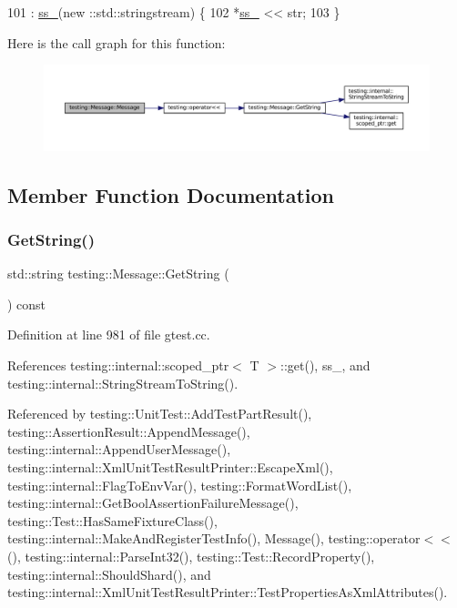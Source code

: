 \begin{DoxyCode}
101                                     : \hyperlink{classtesting_1_1Message_ad46fbddd62cde8526744ae32e3322b76}{ss\_}(new ::std::stringstream) \{
102     *\hyperlink{classtesting_1_1Message_ad46fbddd62cde8526744ae32e3322b76}{ss\_} << str;
103   \}
\end{DoxyCode}
Here is the call graph for this function\+:
\nopagebreak
\begin{figure}[H]
\begin{center}
\leavevmode
\includegraphics[width=350pt]{classtesting_1_1Message_a9de694ca239486809fc99fbbea8ac21d_cgraph}
\end{center}
\end{figure}


\subsection{Member Function Documentation}
\mbox{\label{classtesting_1_1Message_a2cdc4df62bdcc9df37651a1cf527704e}} 
\subsubsection{\texorpdfstring{Get\+String()}{GetString()}}
{\footnotesize\ttfamily std\+::string testing\+::\+Message\+::\+Get\+String (\begin{DoxyParamCaption}{ }\end{DoxyParamCaption}) const}



Definition at line 981 of file gtest.\+cc.



References testing\+::internal\+::scoped\+\_\+ptr$<$ T $>$\+::get(), ss\+\_\+, and testing\+::internal\+::\+String\+Stream\+To\+String().



Referenced by testing\+::\+Unit\+Test\+::\+Add\+Test\+Part\+Result(), testing\+::\+Assertion\+Result\+::\+Append\+Message(), testing\+::internal\+::\+Append\+User\+Message(), testing\+::internal\+::\+Xml\+Unit\+Test\+Result\+Printer\+::\+Escape\+Xml(), testing\+::internal\+::\+Flag\+To\+Env\+Var(), testing\+::\+Format\+Word\+List(), testing\+::internal\+::\+Get\+Bool\+Assertion\+Failure\+Message(), testing\+::\+Test\+::\+Has\+Same\+Fixture\+Class(), testing\+::internal\+::\+Make\+And\+Register\+Test\+Info(), Message(), testing\+::operator$<$$<$(), testing\+::internal\+::\+Parse\+Int32(), testing\+::\+Test\+::\+Record\+Property(), testing\+::internal\+::\+Should\+Shard(), and testing\+::internal\+::\+Xml\+Unit\+Test\+Result\+Printer\+::\+Test\+Properties\+As\+Xml\+Attributes().


